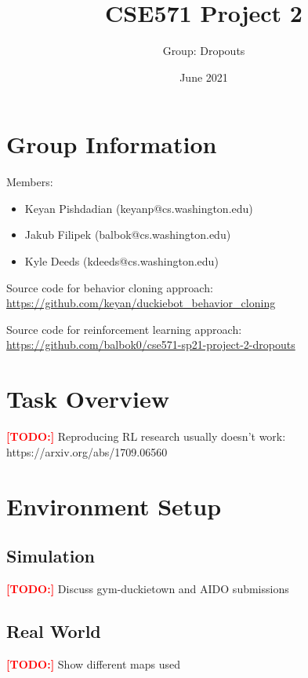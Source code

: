 \documentclass{article}
\title{CSE571 Project 2}
\author{Group: Dropouts}
\date{June 2021}
\newcommand\todo{\textcolor{red}{\textbf{[TODO:] }}}
\begin{document}
\maketitle

\section{Group Information}

Members:
\begin{itemize}
    \item Keyan Pishdadian (keyanp@cs.washington.edu)
    \item Jakub Filipek (balbok@cs.washington.edu)
    \item Kyle Deeds (kdeeds@cs.washington.edu)
\end{itemize}

\noindent Source code for behavior cloning approach:
\newline
\url{https://github.com/keyan/duckiebot_behavior_cloning}

\noindent Source code for reinforcement learning approach:
\newline
\url{https://github.com/balbok0/cse571-sp21-project-2-dropouts}

\section{Task Overview}

\todo Reproducing RL research usually doesn't work: https://arxiv.org/abs/1709.06560

\section{Environment Setup}
\subsection{Simulation}
\todo Discuss gym-duckietown and AIDO submissions

\subsection{Real World}
\todo Show different maps used

\end{document}
